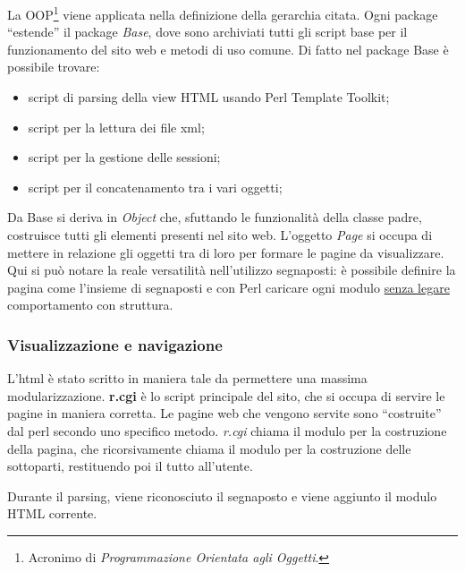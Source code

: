 La OOP\footnote{Acronimo di \textit{Programmazione Orientata agli Oggetti}.} viene applicata nella definizione della gerarchia citata. Ogni package ``estende'' il package \textit{Base}, dove sono archiviati tutti gli script base per il funzionamento del sito web e metodi di uso comune. Di fatto nel package Base \`e possibile trovare:
\begin{itemize}
\item script di parsing della view HTML usando Perl Template Toolkit;
\item script per la lettura dei file xml;
\item script per la gestione delle sessioni;
\item script per il concatenamento tra i vari oggetti;
\end{itemize}

Da Base si deriva in \textit{Object} che, sfuttando le funzionalit\`a della classe padre, costruisce tutti gli elementi presenti nel sito web. L'oggetto \textit{Page} si occupa di mettere in relazione gli oggetti tra di loro per formare le pagine da visualizzare. Qui si pu\`o notare la reale versatilit\`a nell'utilizzo segnaposti: \`e possibile definire la pagina come l'insieme di segnaposti e con Perl caricare ogni modulo \underline{senza legare} comportamento con struttura.




\subsubsection{Visualizzazione e navigazione}

L'html \`e stato scritto in maniera tale da permettere una massima modularizzazione. \textbf{r.cgi} \`e lo script principale del sito, che si occupa di servire le pagine in maniera corretta.
Le pagine web che vengono servite sono ``costruite'' dal perl secondo uno specifico metodo. \textit{r.cgi} chiama il modulo per la costruzione della pagina, che ricorsivamente chiama il modulo per la costruzione delle sottoparti, restituendo poi il tutto all'utente.

Durante il parsing, viene riconosciuto il segnaposto e viene aggiunto il modulo HTML corrente.

